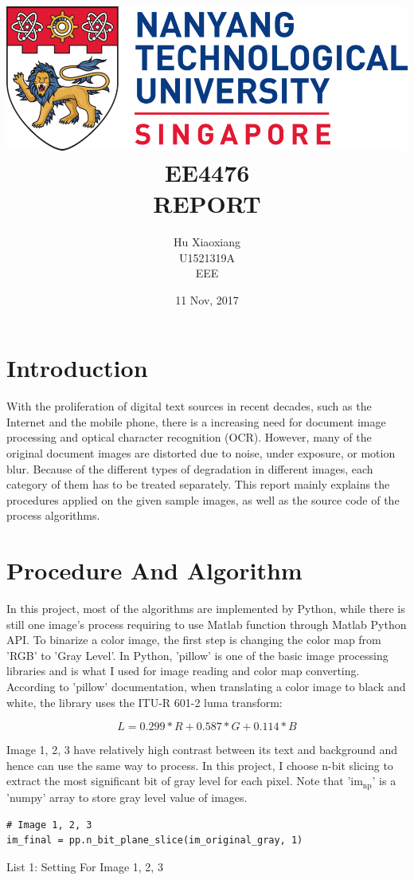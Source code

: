 \documentclass[titlepage]{article}
\author{Hu Xiaoxiang \\
U1521319A \\
EEE \\
}
\date{11 Nov, 2017 \\
}
\title{\includegraphics[width=\textwidth]{logo_ntu_new.png} \\
[5\baselineskip] EE4476 \\
REPORT \\
[5\baselineskip]}
\begin{document}
\maketitle
\tableofcontents

\newpage
{}

\section{Introduction}
\label{sec:orga6587f4}
With the proliferation of digital text sources in recent decades, such as the
Internet and the mobile phone, there is a increasing need for document image
processing and optical character recognition (OCR). However, many of the
original document images are distorted due to noise, under exposure, or motion
blur. Because of the different types of degradation in different images, each
category of them has to be treated separately. This report mainly explains the
procedures applied on the given sample images, as well as the source code of
the process algorithms.

\section{Procedure And Algorithm}
\label{sec:org910259c}
In this project, most of the algorithms are implemented by Python, while there
is still one image's process requiring to use Matlab function through Matlab
Python API. To binarize a color image, the first step is changing the color
map from 'RGB' to 'Gray Level'. In Python, 'pillow' is one of the basic image
processing libraries and is what I used for image reading and color map
converting. According to 'pillow' documentation, when translating a color image
to black and white, the library uses the ITU-R 601-2 luma transform: 

$$ L = 0.299 * R + 0.587 * G + 0.114 * B $$

Image 1, 2, 3 have relatively high contrast between its text and background
and hence can use the same way to process. In this project, I choose n-bit
slicing to extract the most significant bit of gray level for each pixel. Note
that 'im\(_{\text{np}}\)' is a 'numpy' array to store gray level value of images.

\begin{listing}
\begin{verbatim}
# Image 1, 2, 3
im_final = pp.n_bit_plane_slice(im_original_gray, 1)
\end{verbatim}
\centering
\caption{List 1: Setting For Image 1, 2, 3}
\newline
\end{listing}
\end{document}
